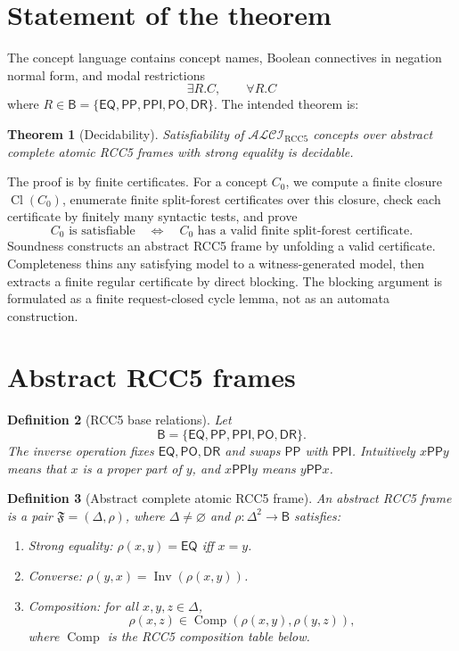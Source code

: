 \documentclass[11pt]{article}
\newtheorem{theorem}{Theorem}[section]
\newtheorem{definition}[theorem]{Definition}
\newcommand{\ALCIRCC}{\ensuremath{\mathcal{ALCI}_{\mathrm{RCC5}}}}
\newcommand{\Cl}{\operatorname{Cl}}
\newcommand{\Base}{\mathsf B}
\newcommand{\EQ}{\mathsf{EQ}}
\newcommand{\PP}{\mathsf{PP}}
\newcommand{\PPI}{\mathsf{PPI}}
\newcommand{\PO}{\mathsf{PO}}
\newcommand{\DR}{\mathsf{DR}}
\newcommand{\Inv}{\operatorname{Inv}}
\newcommand{\comp}{\operatorname{Comp}}
\begin{document}
\tableofcontents

\section{Statement of the theorem}

The concept language contains concept names, Boolean connectives in negation normal form, and modal restrictions
\[
  \exists R.C,\qquad \forall R.C
\]
where \(R\in\Base=\{\EQ,\PP,\PPI,\PO,\DR\}\).  The intended theorem is:

\begin{theorem}[Decidability]\label{thm:main}
Satisfiability of \(\ALCIRCC\) concepts over abstract complete atomic RCC5 frames with strong equality is decidable.
\end{theorem}

The proof is by finite certificates.  For a concept \(C_0\), we compute a finite closure \(\Cl(C_0)\), enumerate finite split-forest certificates over this closure, check each certificate by finitely many syntactic tests, and prove
\[
  C_0 \text{ is satisfiable}
  \quad\Longleftrightarrow\quad
  C_0 \text{ has a valid finite split-forest certificate.}
\]
Soundness constructs an abstract RCC5 frame by unfolding a valid certificate.  Completeness thins any satisfying model to a witness-generated model, then extracts a finite regular certificate by direct blocking.  The blocking argument is formulated as a finite request-closed cycle lemma, not as an automata construction.

\section{Abstract RCC5 frames}

\begin{definition}[RCC5 base relations]
Let
\[
  \Base=\{\EQ,\PP,\PPI,\PO,\DR\}.
\]
The inverse operation fixes \(\EQ,\PO,\DR\) and swaps \(\PP\) with \(\PPI\).  Intuitively \(x\PP y\) means that \(x\) is a proper part of \(y\), and \(x\PPI y\) means \(y\PP x\).
\end{definition}

\begin{definition}[Abstract complete atomic RCC5 frame]
An abstract RCC5 frame is a pair \(\mathfrak F=(\Delta,\rho)\), where \(\Delta\ne\varnothing\) and \(\rho:\Delta^2\to\Base\) satisfies:
\begin{enumerate}[label=(F\arabic*)]
\item \emph{Strong equality:} \(\rho(x,y)=\EQ\) iff \(x=y\).
\item \emph{Converse:} \(\rho(y,x)=\Inv(\rho(x,y))\).
\item \emph{Composition:} for all \(x,y,z\in\Delta\),
\[
  \rho(x,z)\in \comp(\rho(x,y),\rho(y,z)),
\]
where \(\comp\) is the RCC5 composition table below.
\end{enumerate}
\end{definition}
\end{document}
